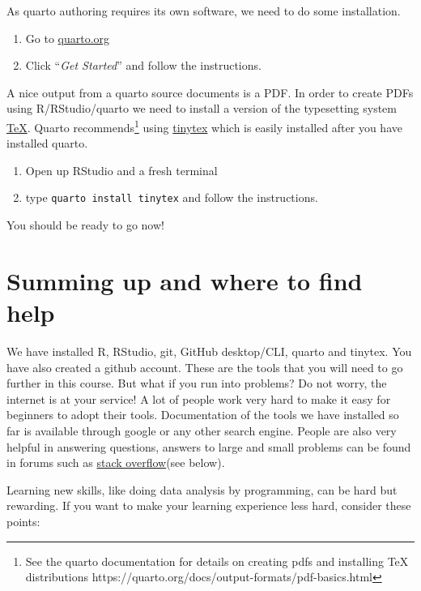 \documentclass[
  11pt,
  letterpaper,
]{scrbook}
\providecommand{\tightlist}{%
  \setlength{\itemsep}{0pt}\setlength{\parskip}{0pt}}\usepackage{longtable,booktabs,array}
\begin{document}
As quarto authoring requires its own software, we need to do some
installation.

\begin{enumerate}
\def\labelenumi{\arabic{enumi}.}
\tightlist
\item
  Go to \href{https://quarto.org/}{quarto.org}
\item
  Click ``\emph{Get Started}'' and follow the instructions.
\end{enumerate}

A nice output from a quarto source documents is a PDF. In order to
create PDFs using R/RStudio/quarto we need to install a version of the
typesetting system \href{https://en.wikipedia.org/wiki/TeX}{TeX}. Quarto
recommends\footnote{See the quarto documentation for details on creating
  pdfs and installing TeX distributions
  https://quarto.org/docs/output-formats/pdf-basics.html} using
\href{https://yihui.org/tinytex/}{tinytex} which is easily installed
after you have installed quarto.

\begin{enumerate}
\def\labelenumi{\arabic{enumi}.}
\tightlist
\item
  Open up RStudio and a fresh terminal
\item
  type \texttt{quarto\ install\ tinytex} and follow the instructions.
\end{enumerate}

You should be ready to go now!

\hypertarget{summing-up-and-where-to-find-help}{%
\section{Summing up and where to find
help}\label{summing-up-and-where-to-find-help}}

We have installed R, RStudio, git, GitHub desktop/CLI, quarto and
tinytex. You have also created a github account. These are the tools
that you will need to go further in this course. But what if you run
into problems? Do not worry, the internet is at your service! A lot of
people work very hard to make it easy for beginners to adopt their
tools. Documentation of the tools we have installed so far is available
through google or any other search engine. People are also very helpful
in answering questions, answers to large and small problems can be found
in forums such as \href{https://stackoverflow.com/}{stack overflow}(see
below).

Learning new skills, like doing data analysis by programming, can be
hard but rewarding. If you want to make your learning experience less
hard, consider these points:
\end{document}
